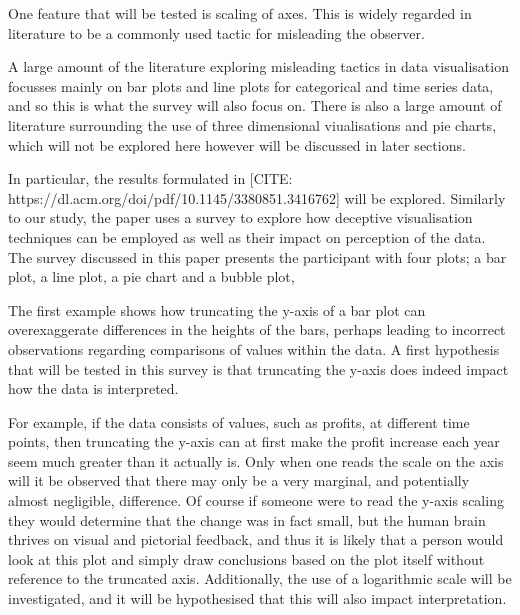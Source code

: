 One feature that will be tested is scaling of axes. This is widely regarded in literature to be a commonly used tactic for misleading the observer.

 





A large amount of the literature exploring misleading tactics in data visualisation focusses mainly on bar plots and line plots for categorical and 
time series data, and so this is what the survey will also focus on. There is also a large amount of literature surrounding the use of three dimensional 
viualisations and pie charts, which will not be explored here however will be discussed in later sections. 


In particular, the results formulated in [CITE: https://dl.acm.org/doi/pdf/10.1145/3380851.3416762] will
be explored. Similarly to our study, the paper uses a survey to explore how deceptive visualisation techniques can be employed as well as their impact 
on perception of the data. The survey discussed in this paper presents the participant with four plots; a bar plot, a line plot, a pie chart and a 
bubble plot, 









The first example shows how truncating the y-axis of a bar plot can overexaggerate differences in the heights of the bars, perhaps leading to incorrect 
observations regarding comparisons of values within the data. A first hypothesis that will be tested in this survey is that truncating the y-axis
does indeed impact how the data is interpreted.

For example, if the data consists of values, such as profits, at different time points, then truncating 
the y-axis can at first make the profit increase each year seem much greater than it actually is. Only when one reads the scale on the 
axis will it be observed that there may only be a very marginal, and potentially almost negligible, difference. Of course if someone 
were to read the y-axis scaling they would determine that the change was in fact small, but the human brain thrives on visual and 
pictorial feedback, and thus it is likely that a person would look at this plot and simply draw conclusions based on the plot itself
without reference to the truncated axis.  Additionally, the use of a logarithmic scale will be investigated, and it will
be hypothesised that this will also impact interpretation.



